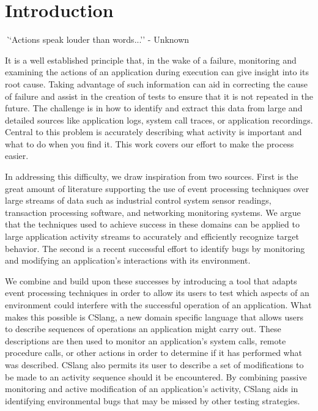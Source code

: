 \section{Introduction}
\label{SEC:introduction}


{\textit ``Actions speak louder than words...'' - Unknown}

It is a well established principle
that, in the wake of a failure,
monitoring and examining the actions
of an application
during execution can give insight
into its root cause.
Taking advantage of such information
can aid in correcting
the cause of failure
and assist in the creation
of tests to ensure that it
is not repeated in the future.
The challenge is in
how to identify and extract this data
from large and detailed sources like application logs,
system call traces,
or application recordings.
Central to this problem
is accurately describing what activity is important
and what to do when you find it.
This work covers our effort to make the process easier.

In addressing this difficulty,
we draw inspiration from two sources.
First is the great amount of literature supporting the use of event
processing techniques over large streams of data such as
industrial control system sensor readings,
transaction processing software,
and networking monitoring systems.
We argue that the techniques used
to achieve success
in these domains
can be applied
to large application activity streams to accurately
and efficiently recognize target behavior.
The second is a recent successful effort
to identify bugs by monitoring
and modifying an application's interactions with its environment.

We combine and build upon these successes
by introducing a tool
that adapts event processing techniques
in order to allow its users to
test which aspects of an environment
could interfere with
the successful operation of an application.
What makes this possible is CSlang,
a new domain specific language
that allows users
to describe sequences of operations
an application might carry out.
These descriptions are then used
to monitor an application's system calls,
remote procedure calls,
or other actions in order to determine if it has
performed what was described.
CSlang also permits
its user to describe a set of modifications
to be made to an activity sequence should it be encountered.
By combining passive monitoring and active modification
of an application's activity,
CSlang aids in identifying environmental bugs
that may be missed by other testing strategies.

